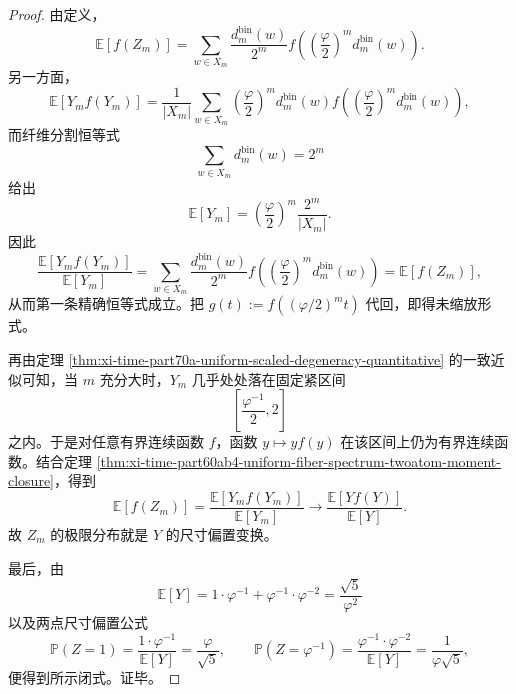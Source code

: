 \begin{proof}
由定义，
\[
\mathbb E[f(Z_m)]
=
\sum_{w\in X_m}\frac{d_m^{\mathrm{bin}}(w)}{2^m}
f\!\left(\left(\frac{\varphi}{2}\right)^m d_m^{\mathrm{bin}}(w)\right).
\]
另一方面，
\[
\mathbb E[Y_m f(Y_m)]
=
\frac{1}{|X_m|}
\sum_{w\in X_m}
\left(\frac{\varphi}{2}\right)^m
d_m^{\mathrm{bin}}(w)
f\!\left(\left(\frac{\varphi}{2}\right)^m d_m^{\mathrm{bin}}(w)\right),
\]
而纤维分割恒等式
\[
\sum_{w\in X_m}d_m^{\mathrm{bin}}(w)=2^m
\]
给出
\[
\mathbb E[Y_m]
=
\left(\frac{\varphi}{2}\right)^m\frac{2^m}{|X_m|}.
\]
因此
\[
\frac{\mathbb E[Y_m f(Y_m)]}{\mathbb E[Y_m]}
=
\sum_{w\in X_m}\frac{d_m^{\mathrm{bin}}(w)}{2^m}
f\!\left(\left(\frac{\varphi}{2}\right)^m d_m^{\mathrm{bin}}(w)\right)
=
\mathbb E[f(Z_m)],
\]
从而第一条精确恒等式成立。把 \(g(t):=f((\varphi/2)^m t)\) 代回，即得未缩放形式。

再由定理 \ref{thm:xi-time-part70a-uniform-scaled-degeneracy-quantitative} 的一致近似可知，当 \(m\) 充分大时，\(Y_m\) 几乎处处落在固定紧区间
\[
\left[\frac{\varphi^{-1}}{2},2\right]
\]
之内。于是对任意有界连续函数 \(f\)，函数 \(y\mapsto y f(y)\) 在该区间上仍为有界连续函数。结合定理 \ref{thm:xi-time-part60ab4-uniform-fiber-spectrum-twoatom-moment-closure}，得到
\[
\mathbb E[f(Z_m)]
=
\frac{\mathbb E[Y_m f(Y_m)]}{\mathbb E[Y_m]}
\longrightarrow
\frac{\mathbb E[Y f(Y)]}{\mathbb E[Y]}.
\]
故 \(Z_m\) 的极限分布就是 \(Y\) 的尺寸偏置变换。

最后，由
\[
\mathbb E[Y]
=
1\cdot \varphi^{-1}
+\varphi^{-1}\cdot \varphi^{-2}
=
\frac{\sqrt5}{\varphi^2}
\]
以及两点尺寸偏置公式
\[
\mathbb P(Z=1)
=
\frac{1\cdot \varphi^{-1}}{\mathbb E[Y]}
=
\frac{\varphi}{\sqrt5},
\qquad
\mathbb P(Z=\varphi^{-1})
=
\frac{\varphi^{-1}\cdot \varphi^{-2}}{\mathbb E[Y]}
=
\frac{1}{\varphi\sqrt5},
\]
便得到所示闭式。证毕。
\end{proof}


